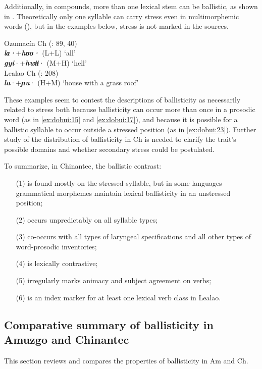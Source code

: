 \documentclass[output=paper]{langscibook}
\begin{document}
Additionally, in compounds, more than one lexical stem can be ballistic, as shown in . Theoretically only one syllable can carry stress even in multimorphemic words (\citealt{GardnerMerrifield1990}), but in the examples below, stress is not marked in the sources.

\ea\label{ex:dobui:17}
\ea
{Ozumacín Ch (\citealt{Rupp2012}: 89, 40)}\\
     \textbf{\textit{lɑ·}}+\textbf{\textit{hʊʊ·}} (L+L) ‘all’\\
     \textbf{\textit{gyi}}·+\textbf{\textit{hwɨɨ}}{{·}} (M+H) ‘hell’\\

\ex
{Lealao Ch (\citealt{RuppRupp1996}: 208)}\\
     \textbf{\textit{la}}{{·}}+\textbf{\textit{ɲu}}{{·}} (H+M) ‘house with a grass roof’\\
\z
\z

These examples seem to contest the descriptions of ballisticity as necessarily related to stress both because ballisticity can occur more than once in a prosodic word (as in \ref{ex:dobui:15} and \ref{ex:dobui:17}), and because it is possible for a ballistic syllable to occur outside a stressed position (as in \ref{ex:dobui:23}). Further study of the distribution of ballisticity in Ch is needed to clarify the trait’s possible domains and whether secondary stress could be postulated.

To summarize, in Chinantec, the ballistic contrast:

\begin{itemize}
\item[(1)] is found mostly on the stressed syllable, but in some languages grammatical morphemes maintain lexical ballisticity in an unstressed position;
\item[(2)] occurs unpredictably on all syllable types;
\item[(3)] co-occurs with all types of laryngeal specifications and all other types of word-prosodic inventories;
\item[(4)] is lexically contrastive;
\item[(5)] irregularly marks animacy and subject agreement on verbs;
\item[(6)] is an index marker for at least one lexical verb class in Lealao.
\end{itemize}

\subsection{Comparative summary of ballisticity in Amuzgo and Chinantec}\label{sec:dobui:3.3}
\label{bkm:Ref124452992}
This section reviews and compares the properties of ballisticity in Am and Ch.
\end{document}

